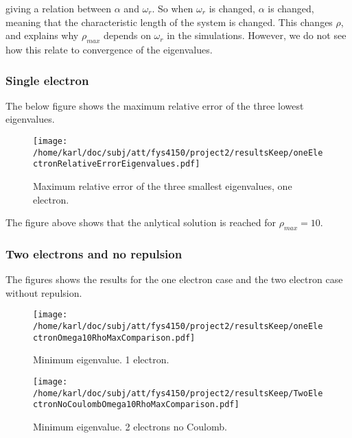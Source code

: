 \documentclass{article}
\begin{document}
giving a relation between $\alpha$ and $\omega_r$. So when $\omega_r$ is changed, $\alpha$ is changed, meaning that the characteristic length of the system is changed. This changes $\rho$, and explains why $\rho_{max}$ depends on $\omega_r$ in the simulations. However, we do not see how this relate to convergence of the eigenvalues.

\subsubsection{Single electron}
The below figure shows the maximum relative error of the three lowest eigenvalues.


\begin{figure}[H]
	\centering
	\texttt{[image: /home/karl/doc/subj/att/fys4150/project2/resultsKeep/oneElectronRelativeErrorEigenvalues.pdf]}
	\caption{Maximum relative error of the three smallest eigenvalues, one electron.}
	\label{1}
\end{figure}

The figure above shows that the anlytical solution is reached for $\rho_{max} = 10$. 

\subsubsection{Two electrons and no repulsion}
The figures shows the results for the one electron case and the two electron case without repulsion.

\begin{minipage}{.49\textwidth} %
	\begin{figure}[H]
		\centering
		\texttt{[image: /home/karl/doc/subj/att/fys4150/project2/resultsKeep/oneElectronOmega10RhoMaxComparison.pdf]}
		\caption{Minimum eigenvalue. 1 electron.}
		\label{1}
	\end{figure}
\end{minipage}\hfill
\vspace{2ex}
\begin{minipage}{.49\textwidth}
	\begin{figure}[H]
		\centering
		\texttt{[image: /home/karl/doc/subj/att/fys4150/project2/resultsKeep/TwoElectronNoCoulombOmega10RhoMaxComparison.pdf]}
		\caption{Minimum eigenvalue. 2 electrons no Coulomb.}
		\label{1}
	\end{figure}
\end{minipage}\hfill
\vspace{2ex}
\end{document}
